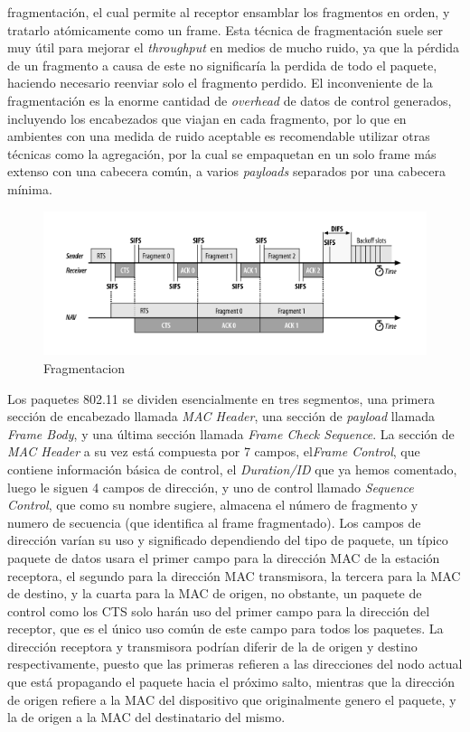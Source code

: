 \documentclass[10pt,a4paper]{article}
\begin{document}
fragmentación, el cual permite al receptor ensamblar los fragmentos en orden, y tratarlo atómicamente como un frame. Esta técnica de fragmentación suele ser muy útil para mejorar el \textit{throughput} en medios de mucho ruido, ya que la pérdida de un fragmento a causa de este no significaría la perdida de todo el paquete, haciendo necesario reenviar solo el fragmento perdido. El inconveniente de la fragmentación es la enorme cantidad de \textit{overhead} de datos de control generados, incluyendo los encabezados que viajan en cada fragmento, por lo que en ambientes con una medida de ruido aceptable es recomendable utilizar otras técnicas como la agregación, por la cual se empaquetan en un solo frame más extenso con una cabecera común, a varios \textit{payloads} separados por una cabecera mínima.


\begin{figure}[H]
\centerline{\includegraphics[scale=0.8]{images/80211_fragmentation_burst.png}}
\caption{Fragmentacion}
\end{figure}

Los paquetes 802.11 se dividen esencialmente en tres segmentos, una primera sección de encabezado llamada \textit{MAC Header}, una sección de \textit{payload} llamada \textit{Frame Body}, y una última sección llamada \textit{Frame Check Sequence}. La sección de \textit{MAC Header} a su vez está compuesta por 7 campos, el\textit{Frame Control}, que contiene información básica de control, el \textit{Duration/ID} que ya hemos comentado, luego le siguen 4 campos de dirección, y uno de control llamado \textit{Sequence Control}, que como su nombre sugiere, almacena el número de fragmento y numero de secuencia (que identifica al frame fragmentado). Los campos de dirección varían su uso y significado dependiendo del tipo de paquete, un típico paquete de datos usara el primer campo para la dirección MAC de la estación receptora, el segundo para la dirección MAC transmisora, la tercera para la MAC de destino, y la cuarta para la MAC de origen, no obstante, un paquete de control como los CTS solo harán uso del primer campo para la dirección del receptor, que es el único uso común de este campo para todos los paquetes. La dirección receptora y transmisora podrían diferir de la de origen y destino respectivamente, puesto que las primeras refieren a las direcciones del nodo actual que está propagando el paquete hacia el próximo salto, mientras que la dirección de origen refiere a la MAC del dispositivo que originalmente genero el paquete, y la de origen a la MAC del destinatario del mismo. 
\end{document}
